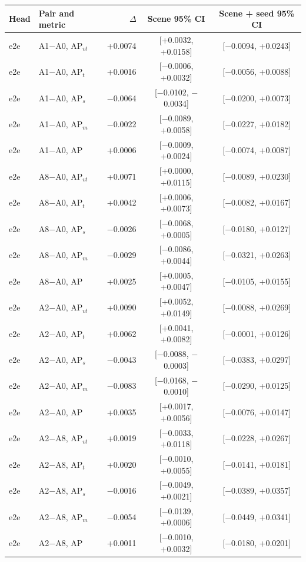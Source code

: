 \begin{tabular}{llrcc}
\toprule
Head & Pair and metric & $\Delta$ & Scene 95\% CI & Scene + seed 95\% CI \\
\midrule
e2e & A1$-$A0, AP$_{vt}$ & +0.0074 & [+0.0032, +0.0158] & [$-$0.0094, +0.0243] \\
e2e & A1$-$A0, AP$_{t}$ & +0.0016 & [$-$0.0006, +0.0032] & [$-$0.0056, +0.0088] \\
e2e & A1$-$A0, AP$_{s}$ & $-$0.0064 & [$-$0.0102, $-$0.0034] & [$-$0.0200, +0.0073] \\
e2e & A1$-$A0, AP$_{m}$ & $-$0.0022 & [$-$0.0089, +0.0058] & [$-$0.0227, +0.0182] \\
e2e & A1$-$A0, AP & +0.0006 & [$-$0.0009, +0.0024] & [$-$0.0074, +0.0087] \\
e2e & A8$-$A0, AP$_{vt}$ & +0.0071 & [+0.0000, +0.0115] & [$-$0.0089, +0.0230] \\
e2e & A8$-$A0, AP$_{t}$ & +0.0042 & [+0.0006, +0.0073] & [$-$0.0082, +0.0167] \\
e2e & A8$-$A0, AP$_{s}$ & $-$0.0026 & [$-$0.0068, +0.0005] & [$-$0.0180, +0.0127] \\
e2e & A8$-$A0, AP$_{m}$ & $-$0.0029 & [$-$0.0086, +0.0044] & [$-$0.0321, +0.0263] \\
e2e & A8$-$A0, AP & +0.0025 & [+0.0005, +0.0047] & [$-$0.0105, +0.0155] \\
e2e & A2$-$A0, AP$_{vt}$ & +0.0090 & [+0.0052, +0.0149] & [$-$0.0088, +0.0269] \\
e2e & A2$-$A0, AP$_{t}$ & +0.0062 & [+0.0041, +0.0082] & [$-$0.0001, +0.0126] \\
e2e & A2$-$A0, AP$_{s}$ & $-$0.0043 & [$-$0.0088, $-$0.0003] & [$-$0.0383, +0.0297] \\
e2e & A2$-$A0, AP$_{m}$ & $-$0.0083 & [$-$0.0168, $-$0.0010] & [$-$0.0290, +0.0125] \\
e2e & A2$-$A0, AP & +0.0035 & [+0.0017, +0.0056] & [$-$0.0076, +0.0147] \\
e2e & A2$-$A8, AP$_{vt}$ & +0.0019 & [$-$0.0033, +0.0118] & [$-$0.0228, +0.0267] \\
e2e & A2$-$A8, AP$_{t}$ & +0.0020 & [$-$0.0010, +0.0055] & [$-$0.0141, +0.0181] \\
e2e & A2$-$A8, AP$_{s}$ & $-$0.0016 & [$-$0.0049, +0.0021] & [$-$0.0389, +0.0357] \\
e2e & A2$-$A8, AP$_{m}$ & $-$0.0054 & [$-$0.0139, +0.0006] & [$-$0.0449, +0.0341] \\
e2e & A2$-$A8, AP & +0.0011 & [$-$0.0010, +0.0032] & [$-$0.0180, +0.0201] \\

\end{tabular}
